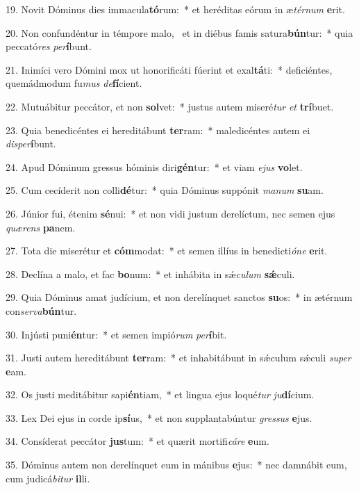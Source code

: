 19. Novit Dóminus dies immacula\textbf{tó}rum:~*  et heréditas eórum in æ\textit{tér}\textit{num} \textbf{e}rit.\

20. Non confundéntur in témpore malo, \dag\  et in diébus famis satura\textbf{bún}tur:~*  quia peccató\textit{res} \textit{per}\textbf{í}bunt.\

21. Inimíci vero Dómini mox ut honorificáti fúerint et exal\textbf{tá}ti:~*  deficiéntes, quemádmodum fu\textit{mus} \textit{de}\textbf{fí}cient.\

22. Mutuábitur peccátor, et non \textbf{sol}vet:~*  justus autem miseré\textit{tur} \textit{et} \textbf{trí}buet.\

23. Quia benedicéntes ei hereditábunt \textbf{ter}ram:~*  maledicéntes autem ei \textit{dis}\textit{per}\textbf{í}bunt.\

24. Apud Dóminum gressus hóminis diri\textbf{gén}tur:~*  et viam \textit{e}\textit{jus} \textbf{vo}let.\

25. Cum cecíderit non colli\textbf{dé}tur:~*  quia Dóminus suppónit \textit{ma}\textit{num} \textbf{su}am.\

26. Júnior fui, étenim \textbf{sé}nui:~*  et non vidi justum derelíctum, nec semen ejus \textit{quæ}\textit{rens} \textbf{pa}nem.\

27. Tota die miserétur et \textbf{cóm}modat:~*  et semen illíus in benedicti\textit{ó}\textit{ne} \textbf{e}rit.\

28. Declína a malo, et fac \textbf{bo}num:~*  et inhábita in sǽ\textit{cu}\textit{lum} \textbf{sǽ}culi.\

29. Quia Dóminus amat judícium, et non derelínquet sanctos \textbf{su}os:~*  in ætérnum con\textit{ser}\textit{va}\textbf{bún}tur.\

30. Injústi puni\textbf{én}tur:~*  et semen impió\textit{rum} \textit{per}\textbf{í}bit.\

31. Justi autem hereditábunt \textbf{ter}ram:~*  et inhabitábunt in sǽculum sǽculi \textit{su}\textit{per} \textbf{e}am.\

32. Os justi meditábitur sapi\textbf{én}tiam,~*  et lingua ejus loqué\textit{tur} \textit{ju}\textbf{dí}cium.\

33. Lex Dei ejus in corde ip\textbf{sí}us,~*  et non supplantabúntur \textit{gres}\textit{sus} \textbf{e}jus.\

34. Consíderat peccátor \textbf{jus}tum:~*  et quærit mortifi\textit{cá}\textit{re} \textbf{e}um.\

35. Dóminus autem non derelínquet eum in mánibus \textbf{e}jus:~*  nec damnábit eum, cum judicá\textit{bi}\textit{tur} \textbf{il}li.\

